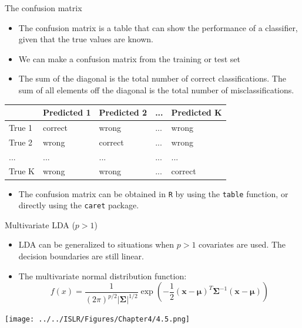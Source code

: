 \documentclass[10pt,ignorenonframetext,]{beamer}
\providecommand{\tightlist}{%
  \setlength{\itemsep}{0pt}\setlength{\parskip}{0pt}}
\begin{document}
\begin{frame}[fragile]

\begin{block}{The confusion matrix}

\vspace{2mm}

\begin{itemize}
\item
  The confusion matrix is a table that can show the performance of a
  classifier, given that the true values are known.
\item
  We can make a confusion matrix from the training or test set
\item
  The sum of the diagonal is the total number of correct
  classifications. The sum of all elements off the diagonal is the total
  number of misclassifications.
\end{itemize}

\begin{center}

\begin{tabular}{l|l|l|l|l}
\hline
 & Predicted 1 & Predicted 2 & ... & Predicted K\\
\hline
True 1 & correct & wrong & ... & wrong\\
\hline
True 2 & wrong & correct & ... & wrong\\
\hline
... & ... & ... & ... & ...\\
\hline
True K & wrong & wrong & ... & correct\\
\hline
\end{tabular}
\end{center}

\begin{itemize}
\tightlist
\item
  The confusion matrix can be obtained in \texttt{R} by using the
  \texttt{table} function, or directly using the \texttt{caret} package.
\end{itemize}

\end{block}

\end{frame}

\begin{frame}{Multivariate LDA (\(p>1\))}

\vspace{2mm}

\begin{itemize}
\item
  LDA can be generalized to situations when \(p>1\) covariates are used.
  The decision boundaries are still linear.
\item
  The multivariate normal distribution function:
  \[f(x) = \frac{1}{(2 \pi)^{p/2}|\boldsymbol{\Sigma}|^{1/2}}\exp({-\frac{1}{2}({\boldsymbol x}-\boldsymbol\mu)^T \boldsymbol{\Sigma}^{-1}({\boldsymbol x}-\boldsymbol\mu)})\]
\end{itemize}

\centering
\texttt{[image: ../../ISLR/Figures/Chapter4/4.5.png]}

\end{frame}
\end{document}
